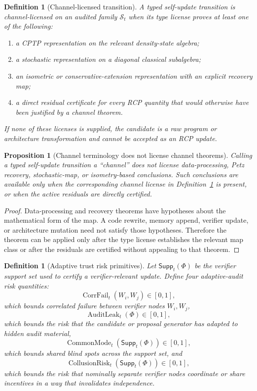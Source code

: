 \documentclass[11pt]{article}
\newtheorem{proposition}[theorem]{Proposition}
\newtheorem{definition}[theorem]{Definition}
\newcommand{\1}{\mathbf{1}}
\providecommand{\Scal}{\mathcal{S}}
\providecommand{\CorrFail}{\operatorname{CorrFail}}
\providecommand{\AuditLeak}{\operatorname{AuditLeak}}
\providecommand{\CommonMode}{\operatorname{CommonMode}}
\providecommand{\CollusionRisk}{\operatorname{CollusionRisk}}
\begin{document}
\begin{definition}[Channel-licensed transition]
\label{def:channel_licensed_transition_batch10}
A typed self-update transition is channel-licensed on an audited family \(\Scal_t\) when its type license proves at least one of the following:
\begin{enumerate}[label=(\alph*),leftmargin=1.5em]
    \item a CPTP representation on the relevant density-state algebra;
    \item a stochastic representation on a diagonal classical subalgebra;
    \item an isometric or conservative-extension representation with an explicit recovery map;
    \item a direct residual certificate for every RCP quantity that would otherwise have been justified by a channel theorem.
\end{enumerate}
If none of these licenses is supplied, the candidate is a raw program or architecture transformation and cannot be accepted as an RCP update.
\end{definition}

\begin{proposition}[Channel terminology does not license channel theorems]
\label{prop:channel_terminology_no_license_batch10}
Calling a typed self-update transition a ``channel'' does not license data-processing, Petz recovery, stochastic-map, or isometry-based conclusions.  Such conclusions are available only when the corresponding channel license in Definition~\ref{def:channel_licensed_transition_batch10} is present, or when the active residuals are directly certified.
\end{proposition}

\begin{proof}
Data-processing and recovery theorems have hypotheses about the mathematical form of the map.  A code rewrite, memory append, verifier update, or architecture mutation need not satisfy those hypotheses.  Therefore the theorem can be applied only after the type license establishes the relevant map class or after the residuals are certified without appealing to that theorem.
\end{proof}

\begin{definition}[Adaptive trust risk primitives]
\label{def:adaptive_trust_risk_primitives_batch10}
Let \(\mathsf{Supp}_t(\Phi)\) be the verifier support set used to certify a verifier-relevant update.  Define four adaptive-audit risk quantities:
\[
\CorrFail_t(W_i,W_j)\in[0,1],
\]
which bounds correlated failure between verifier nodes \(W_i,W_j\),
\[
\AuditLeak_t(\Phi)\in[0,1],
\]
which bounds the risk that the candidate or proposal generator has adapted to hidden audit material,
\[
\CommonMode_t(\mathsf{Supp}_t(\Phi))\in[0,1],
\]
which bounds shared blind spots across the support set, and
\[
\CollusionRisk_t(\mathsf{Supp}_t(\Phi))\in[0,1],
\]
which bounds the risk that nominally separate verifier nodes coordinate or share incentives in a way that invalidates independence.
\end{definition}
\end{document}
